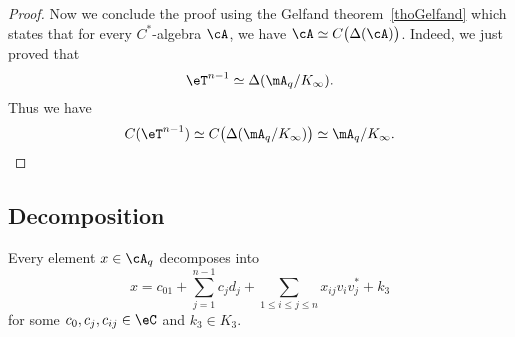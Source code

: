 \begin{proof}
    Now we conclude the proof using the Gelfand theorem~\ref{thoGelfand} which states that for every $C^*$-algebra $\cA$, we have $\cA\simeq C\big( \Delta(\cA) \big)$. Indeed, we just proved that
    \begin{equation}
        \eT^{n-1}\simeq\Delta(\mA_q/K_{\infty}).
    \end{equation}
    Thus we have
    \begin{equation}
        C(\eT^{n-1})\simeq C\big( \Delta(\mA_q/K_{\infty}) \big)\simeq\mA_q/K_{\infty}.
    \end{equation}
\end{proof}

\subsection{Decomposition}

\begin{proposition}
    Every element $x\in\cA_q$ decomposes into
    \begin{equation}
        x=c_01+\sum_{j=1}^{n-1}c_jd_j+\sum_{1\leq i\leq j\leq n}x_{ij}v_iv_j^*+k_3
    \end{equation}
    for some $c_0,c_j,c_{ij}\in \eC$ and $k_3\in K_3$.
\end{proposition}

